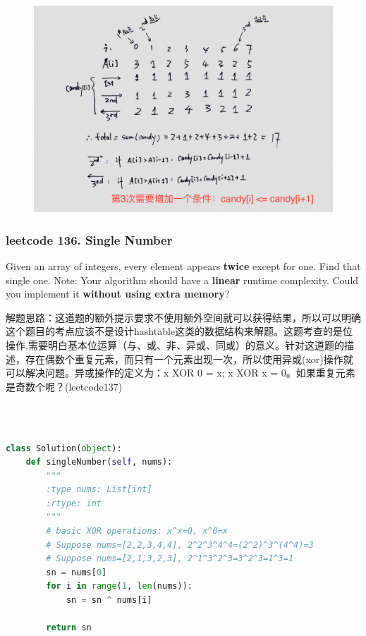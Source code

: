 \documentclass[a4paper,10pt]{article}
\begin{document}
\begin{figure}[h]
    \includegraphics[width=\textwidth]{leetcode135.jpg}
    \centering \\
\end{figure}



\subsubsection{leetcode 136. Single Number}
Given an array of integers, every element appears \textbf{twice} except for one. Find that single one. Note: Your algorithm should have a \textbf{linear} runtime complexity. Could you implement it \textbf{without using extra memory}?\\

\begin{CJK*}{UTF8}{gbsn}
\noindent 解题思路：这道题的额外提示要求不使用额外空间就可以获得结果，所以可以明确这个题目的考点应该不是设计hashtable这类的数据结构来解题。这题考查的是位操作,需要明白基本位运算（与、或、非、异或、同或）的意义。针对这道题的描述，存在偶数个重复元素，而只有一个元素出现一次，所以使用异或(xor)操作就可以解决问题。异或操作的定义为：x XOR 0 = x; x XOR x = 0。如果重复元素是奇数个呢？(leetcode137)
\end{CJK*}\\

\begin{lstlisting}[language=Python, caption=Problem136. Single Number]

class Solution(object):
    def singleNumber(self, nums):
        """
        :type nums: List[int]
        :rtype: int
        """
        # basic XOR operations: x^x=0, x^0=x
        # Suppose nums=[2,2,3,4,4], 2^2^3^4^4=(2^2)^3^(4^4)=3
        # Suppose nums=[2,1,3,2,3], 2^1^3^2^3=3^2^3=1^3=1
        sn = nums[0]
        for i in range(1, len(nums)):
            sn = sn ^ nums[i]
        
        return sn
\end{lstlisting}
\end{document}
